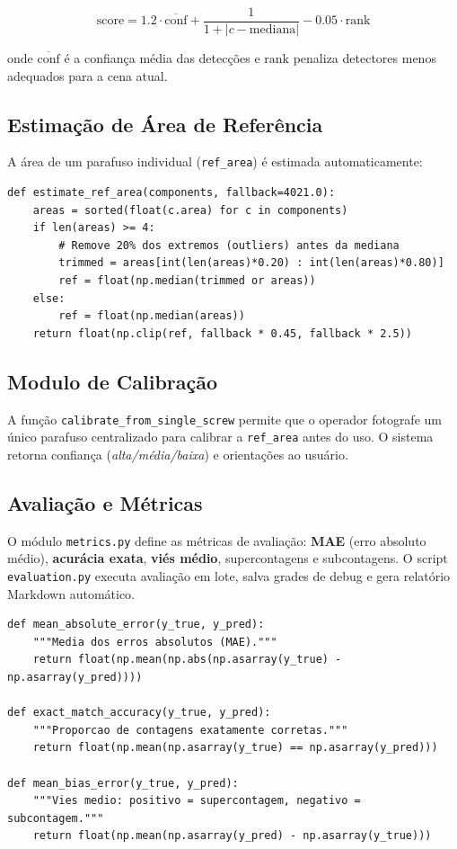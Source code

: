 \documentclass[12pt,a4paper]{article}
\begin{document}
$$\text{score} = 1.2 \cdot \overline{\text{conf}} + \frac{1}{1 + |c - \text{mediana}|} - 0.05 \cdot \text{rank}$$

onde $\overline{\text{conf}}$ \'e a confian\c{c}a m\'edia das detec\c{c}\~oes e
$\text{rank}$ penaliza detectores menos adequados para a cena atual.

\subsection{Estima\c{c}\~ao de \'Area de Refer\^encia}

A \'area de um parafuso individual (\texttt{ref\_area}) \'e estimada automaticamente:

\begin{lstlisting}[caption={Estima\c{c}\~ao robusta da \'area de refer\^encia}]
def estimate_ref_area(components, fallback=4021.0):
    areas = sorted(float(c.area) for c in components)
    if len(areas) >= 4:
        # Remove 20% dos extremos (outliers) antes da mediana
        trimmed = areas[int(len(areas)*0.20) : int(len(areas)*0.80)]
        ref = float(np.median(trimmed or areas))
    else:
        ref = float(np.median(areas))
    return float(np.clip(ref, fallback * 0.45, fallback * 2.5))
\end{lstlisting}

\subsection{Modulo de Calibra\c{c}\~ao}

A fun\c{c}\~ao \texttt{calibrate\_from\_single\_screw} permite que o operador fotografe
um \'unico parafuso centralizado para calibrar a \texttt{ref\_area} antes do uso.
O sistema retorna confian\c{c}a (\emph{alta/m\'edia/baixa}) e orienta\c{c}\~oes ao usu\'ario.

\subsection{Avalia\c{c}\~ao e M\'etricas}

O m\'odulo \texttt{metrics.py} define as m\'etricas de avalia\c{c}\~ao:
\textbf{MAE} (erro absoluto m\'edio), \textbf{acur\'acia exata}, \textbf{vi\'es m\'edio},
supercontagens e subcontagens. O script \texttt{evaluation.py} executa avalia\c{c}\~ao
em lote, salva grades de debug e gera relat\'orio Markdown autom\'atico.

\begin{lstlisting}[caption={M\'etricas de avalia\c{c}\~ao (\texttt{metrics.py})}]
def mean_absolute_error(y_true, y_pred):
    """Media dos erros absolutos (MAE)."""
    return float(np.mean(np.abs(np.asarray(y_true) - np.asarray(y_pred))))

def exact_match_accuracy(y_true, y_pred):
    """Proporcao de contagens exatamente corretas."""
    return float(np.mean(np.asarray(y_true) == np.asarray(y_pred)))

def mean_bias_error(y_true, y_pred):
    """Vies medio: positivo = supercontagem, negativo = subcontagem."""
    return float(np.mean(np.asarray(y_pred) - np.asarray(y_true)))
\end{lstlisting}
\end{document}
